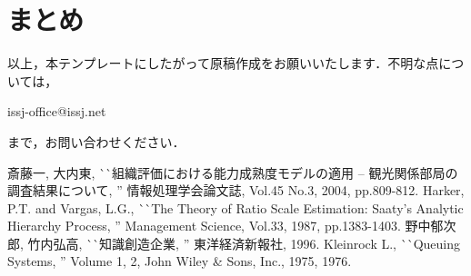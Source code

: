 \documentclass[dvipdfmx]{issj}
\begin{document}
\section{まとめ}  %

以上，本テンプレートにしたがって原稿作成をお願いいたします．不明な点については，
\begin{center}
    issj-office@issj.net
\end{center}
まで，お問い合わせください．

\begin{thebibliography}{99}
   斎藤一, 大内東, 
                       ^^ ^^ 組織評価における能力成熟度モデルの適用 -- 観光関係部局の調査結果について, '' 
                       情報処理学会論文誌, Vol.45 No.3, 2004, pp.809-812.
   Harker, P.T. and Vargas, L.G., 
                       ^^ ^^ The Theory of Ratio Scale Estimation: Saaty’s Analytic Hierarchy Process, '' 
                       Management Science, Vol.33, 1987, pp.1383-1403.
   野中郁次郎, 竹内弘高, ^^ ^^ 知識創造企業, '' 東洋経済新報社, 1996.
    Kleinrock L., 
                       ^^ ^^ Queuing Systems, '' Volume 1, 2, John Wiley \& Sons, Inc., 1975, 1976.
\end{thebibliography}
\end{document}
